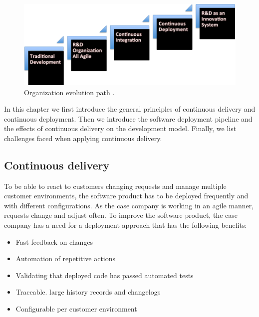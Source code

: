 \documentclass[english]{tktltiki2}
\theoremstyle{definition}
\theoremstyle{remark}
\begin{document}
\begin{figure}[h]
	\centering
	\includegraphics[width=5.0in]{stairway.png}
	\caption{Organization evolution path \cite{olsson2012climbing}.}
	\label{fig1}
\end{figure}

In this chapter we first introduce the general principles of continuous delivery and continuous deployment. Then we introduce the software deployment pipeline and the effects of continuous delivery on the development model. Finally, we list challenges faced when applying continuous delivery.




\subsection{Continuous delivery}
To be able to react to customers changing requests and manage multiple customer environments, the software product has to be deployed frequently and with different configurations. As the case company is working in an agile manner, requests change and adjust often. To improve the software product, the case company has a need for a deployment approach that has the following benefits:

\begin{itemize}
\item Fast feedback on changes
\item Automation of repetitive actions
\item Validating that deployed code has passed automated tests 
\item Traceable. large history records and changelogs
\item Configurable per customer environment
\end{itemize}
\end{document}
